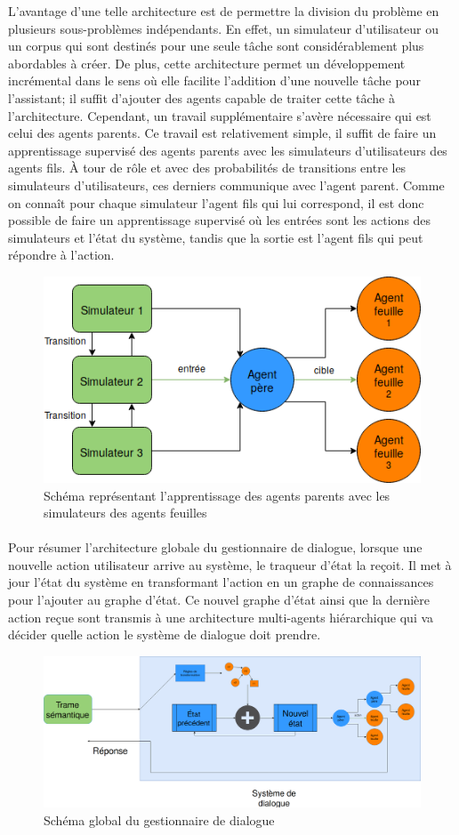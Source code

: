 L'avantage d'une telle architecture est de permettre la division du problème en plusieurs sous-problèmes indépendants. En effet, un simulateur d'utilisateur ou un corpus qui sont destinés pour une seule tâche sont considérablement plus abordables à créer. De plus, cette architecture permet un développement incrémental dans le sens où elle facilite l'addition d'une nouvelle tâche pour l'assistant; il suffit d'ajouter des agents capable de traiter cette tâche à l'architecture. Cependant, un travail supplémentaire s'avère nécessaire qui est celui des agents parents. Ce travail est relativement simple, il suffit de faire un apprentissage supervisé des agents parents avec les simulateurs d'utilisateurs des agents fils. À tour de rôle et avec des probabilités de transitions entre les simulateurs d'utilisateurs, ces derniers communique avec l'agent parent. Comme on connaît pour chaque simulateur l'agent fils qui lui correspond, il est donc possible de faire un apprentissage supervisé où les entrées sont les actions des simulateurs et l'état du système, tandis que la sortie est l'agent fils qui peut répondre à l'action.
\begin{figure}[H] 
	
	\centering
	\includegraphics[width=0.5\linewidth]{images/Conception/DM/train_parent.png}
	\caption{Schéma représentant l'apprentissage des agents parents avec les simulateurs des agents feuilles}
\end{figure}\label{train_parent}
\paragraph{}
Pour résumer l'architecture globale du gestionnaire de dialogue, lorsque une nouvelle action utilisateur arrive au système, le traqueur d'état la reçoit. Il met à jour l'état du système en transformant l'action en un graphe de connaissances pour l'ajouter au graphe d'état. Ce nouvel graphe d'état ainsi que la dernière action reçue sont transmis à une architecture multi-agents hiérarchique qui va décider quelle action le système de dialogue doit prendre.
\begin{figure}[H] 
	
	\centering
	\includegraphics[width=0.88\linewidth]{images/Conception/DM/globalDM.png}
	\caption{Schéma global du gestionnaire de dialogue}
\end{figure}\label{globalDM}
